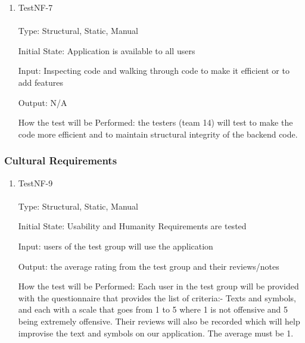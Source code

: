 \documentclass[12pt, titlepage]{article}
\begin{document}

\begin{enumerate}

\item{TestNF-7\\\\}
Type: Structural, Static, Manual

Initial State: Application is available to all users

Input: Inspecting code and walking through code to make it efficient or to add features	

Output: N/A

How the test will be Performed: the testers (team 14) will test to make the code more efficient and to maintain structural integrity of the backend code. 

\end{enumerate}

\subsubsection{Cultural Requirements}


\begin{enumerate}

\item{TestNF-9\\\\}
Type: Structural, Static, Manual

Initial State: Usability and Humanity Requirements are tested

Input: users of the test group will use the application 

Output: the average rating from the test group and their reviews/notes

How the test will be Performed: Each user in the test group will be provided with the questionnaire that provides the list of criteria:- Texts and symbols, and each with a scale that goes from 1 to 5 where 1 is not offensive and 5 being extremely offensive. Their reviews will also be recorded which will help improvise the text and symbols on our application. The average must be 1. 

\end{enumerate}
\end{document}
